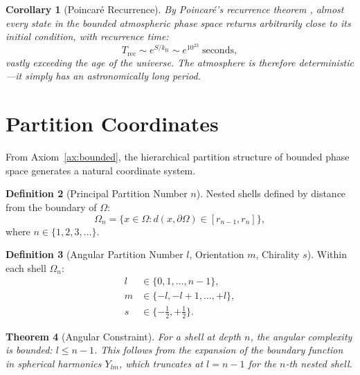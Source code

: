 \documentclass[twocolumn,10pt]{article}
\newtheorem{theorem}{Theorem}[section]
\newtheorem{corollary}[theorem]{Corollary}
\theoremstyle{definition}
\newtheorem{definition}[theorem]{Definition}
\newcommand{\kB}{k_{\mathrm{B}}}
\begin{document}
\begin{corollary}[Poincar\'e Recurrence]\label{cor:poincare}
By Poincar\'e's recurrence theorem \citep{Poincare1890}, almost every state in the bounded atmospheric phase space returns arbitrarily close to its initial condition, with recurrence time:
\begin{equation}\label{eq:recurrence}
    T_{\mathrm{rec}} \sim e^{S/\kB} \sim e^{10^{23}} \;\text{seconds},
\end{equation}
vastly exceeding the age of the universe. The atmosphere is therefore deterministic---it simply has an astronomically long period.
\end{corollary}

\section{Partition Coordinates}\label{sec:partition_coords}

From Axiom~\ref{ax:bounded}, the hierarchical partition structure of bounded phase space generates a natural coordinate system.

\begin{definition}[Principal Partition Number $n$]
Nested shells defined by distance from the boundary of $\Omega$:
\begin{equation}
    \Omega_n = \{x \in \Omega : d(x, \partial\Omega) \in [r_{n-1}, r_n]\},
\end{equation}
where $n \in \{1, 2, 3, \ldots\}$.
\end{definition}

\begin{definition}[Angular Partition Number $l$, Orientation $m$, Chirality $s$]
Within each shell $\Omega_n$:
\begin{align}
    l &\in \{0, 1, \ldots, n-1\}, \\
    m &\in \{-l, -l+1, \ldots, +l\}, \\
    s &\in \{-\tfrac{1}{2}, +\tfrac{1}{2}\}.
\end{align}
\end{definition}

\begin{theorem}[Angular Constraint]\label{thm:angular}
For a shell at depth $n$, the angular complexity is bounded: $l \leq n - 1$. This follows from the expansion of the boundary function in spherical harmonics $Y_{lm}$, which truncates at $l = n - 1$ for the $n$-th nested shell.
\end{theorem}
\end{document}
